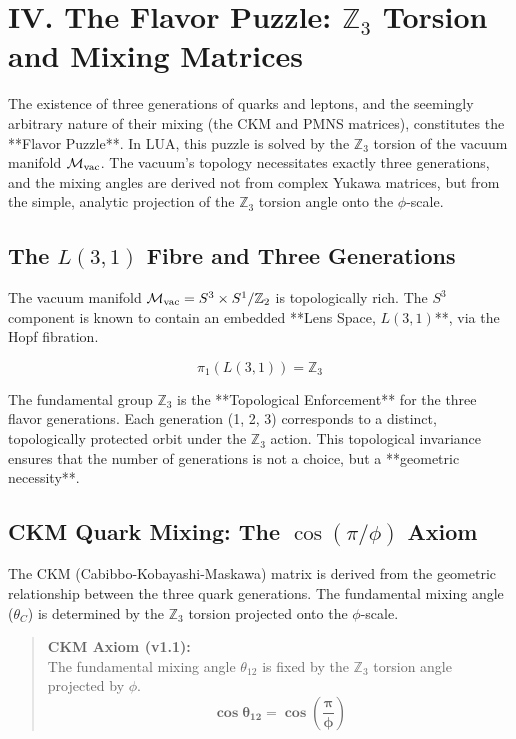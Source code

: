 \section{IV. The Flavor Puzzle: $\mathbb{Z}_3$ Torsion and Mixing Matrices}
\label{sec:flavor}

The existence of three generations of quarks and leptons, and the seemingly arbitrary nature of their mixing (the CKM and PMNS matrices), constitutes the **Flavor Puzzle**. In LUA, this puzzle is solved by the $\mathbb{Z}_3$ torsion of the vacuum manifold $\mathcal{M}_{\rm vac}$. The vacuum's topology necessitates exactly three generations, and the mixing angles are derived not from complex Yukawa matrices, but from the simple, analytic projection of the $\mathbb{Z}_3$ torsion angle onto the $\phi$-scale.

\subsection{The $L(3,1)$ Fibre and Three Generations}
\label{sec:threegen}

The vacuum manifold $\mathcal{M}_{\rm vac} = S^3 \times S^1 / \mathbb{Z}_2$ is topologically rich. The $S^3$ component is known to contain an embedded **Lens Space, $L(3,1)$**, via the Hopf fibration.

$$
\pi_1(L(3,1)) = \mathbb{Z}_3
$$

The fundamental group $\mathbb{Z}_3$ is the **Topological Enforcement** for the three flavor generations. Each generation (1, 2, 3) corresponds to a distinct, topologically protected orbit under the $\mathbb{Z}_3$ action. This topological invariance ensures that the number of generations is not a choice, but a **geometric necessity**.

\subsection{CKM Quark Mixing: The $\cos(\pi/\phi)$ Axiom}
\label{sec:ckm}

The CKM (Cabibbo-Kobayashi-Maskawa) matrix is derived from the geometric relationship between the three quark generations. The fundamental mixing angle ($\theta_C$) is determined by the $\mathbb{Z}_3$ torsion projected onto the $\phi$-scale.

\begin{quote}
\textbf{CKM Axiom (v1.1):} \\
The fundamental mixing angle $\theta_{12}$ is fixed by the $\mathbb{Z}_3$ torsion angle projected by $\phi$.
$$
\mathbf{\cos\theta_{12} = \cos\left(\frac{\pi}{\phi}\right)}
$$
\end{quote}

